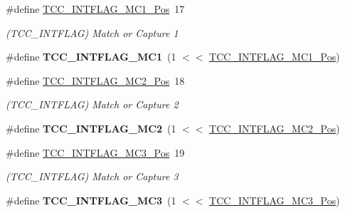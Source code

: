 \begin{DoxyCompactItemize}
\item 
\hypertarget{group___s_a_m_l21___t_c_c_gac20db2ccec9841cc4f16f04978150076}{}\#define \hyperlink{group___s_a_m_l21___t_c_c_gac20db2ccec9841cc4f16f04978150076}{T\+C\+C\+\_\+\+I\+N\+T\+F\+L\+A\+G\+\_\+\+M\+C1\+\_\+\+Pos}~17\label{group___s_a_m_l21___t_c_c_gac20db2ccec9841cc4f16f04978150076}

\begin{DoxyCompactList}\small\item\em (T\+C\+C\+\_\+\+I\+N\+T\+F\+L\+A\+G) Match or Capture 1 \end{DoxyCompactList}\item 
\hypertarget{group___s_a_m_l21___t_c_c_ga4855f4c907c193b2a8b6432319b43c1c}{}\#define {\bfseries T\+C\+C\+\_\+\+I\+N\+T\+F\+L\+A\+G\+\_\+\+M\+C1}~(1 $<$$<$ \hyperlink{group___s_a_m_l21___t_c_c_gac20db2ccec9841cc4f16f04978150076}{T\+C\+C\+\_\+\+I\+N\+T\+F\+L\+A\+G\+\_\+\+M\+C1\+\_\+\+Pos})\label{group___s_a_m_l21___t_c_c_ga4855f4c907c193b2a8b6432319b43c1c}

\item 
\hypertarget{group___s_a_m_l21___t_c_c_ga331eb0b2f2d6380cbdb7f7e069d0b575}{}\#define \hyperlink{group___s_a_m_l21___t_c_c_ga331eb0b2f2d6380cbdb7f7e069d0b575}{T\+C\+C\+\_\+\+I\+N\+T\+F\+L\+A\+G\+\_\+\+M\+C2\+\_\+\+Pos}~18\label{group___s_a_m_l21___t_c_c_ga331eb0b2f2d6380cbdb7f7e069d0b575}

\begin{DoxyCompactList}\small\item\em (T\+C\+C\+\_\+\+I\+N\+T\+F\+L\+A\+G) Match or Capture 2 \end{DoxyCompactList}\item 
\hypertarget{group___s_a_m_l21___t_c_c_ga5a87b664107c358a750aa86c1fdcee6e}{}\#define {\bfseries T\+C\+C\+\_\+\+I\+N\+T\+F\+L\+A\+G\+\_\+\+M\+C2}~(1 $<$$<$ \hyperlink{group___s_a_m_l21___t_c_c_ga331eb0b2f2d6380cbdb7f7e069d0b575}{T\+C\+C\+\_\+\+I\+N\+T\+F\+L\+A\+G\+\_\+\+M\+C2\+\_\+\+Pos})\label{group___s_a_m_l21___t_c_c_ga5a87b664107c358a750aa86c1fdcee6e}

\item 
\hypertarget{group___s_a_m_l21___t_c_c_ga50d3c305dbd0a14eb93b77e7fd07a3de}{}\#define \hyperlink{group___s_a_m_l21___t_c_c_ga50d3c305dbd0a14eb93b77e7fd07a3de}{T\+C\+C\+\_\+\+I\+N\+T\+F\+L\+A\+G\+\_\+\+M\+C3\+\_\+\+Pos}~19\label{group___s_a_m_l21___t_c_c_ga50d3c305dbd0a14eb93b77e7fd07a3de}

\begin{DoxyCompactList}\small\item\em (T\+C\+C\+\_\+\+I\+N\+T\+F\+L\+A\+G) Match or Capture 3 \end{DoxyCompactList}\item 
\hypertarget{group___s_a_m_l21___t_c_c_ga90a07d26ef6a8c221125ea0acfcae46b}{}\#define {\bfseries T\+C\+C\+\_\+\+I\+N\+T\+F\+L\+A\+G\+\_\+\+M\+C3}~(1 $<$$<$ \hyperlink{group___s_a_m_l21___t_c_c_ga50d3c305dbd0a14eb93b77e7fd07a3de}{T\+C\+C\+\_\+\+I\+N\+T\+F\+L\+A\+G\+\_\+\+M\+C3\+\_\+\+Pos})\label{group___s_a_m_l21___t_c_c_ga90a07d26ef6a8c221125ea0acfcae46b}


\end{DoxyCompactItemize}

